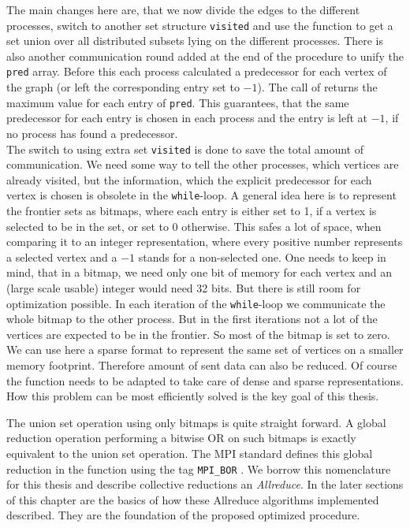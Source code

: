 The main changes here are, that we now divide the edges to the different processes, switch to another set structure \texttt{visited} and use the function  to get a set union over all distributed subsets lying on the different processes. There is also another communication round added at the end of the procedure to unify the \texttt{pred} array.
Before this each process calculated a predecessor for each vertex of the graph (or left the corresponding entry set to $-1$). The call of  returns the maximum value for each entry of \texttt{pred}. This guarantees, that the same predecessor for each entry is chosen in each process and the entry is left at $-1$, if no process has found a predecessor. \\
The switch to using extra set \texttt{visited} is done to save the total amount of communication. We need some way to tell the other processes, which vertices are already visited, but the information, which the explicit predecessor for each vertex is chosen is obsolete in the \texttt{while}-loop.
A general idea here is to represent the frontier sets as bitmaps, where each entry is either set to 1, if a vertex is selected to be in the set, or set to 0 otherwise.
This safes a lot of space, when comparing it to an integer representation, where every positive number represents a selected vertex and a $-1$ stands for a non-selected one.
One needs to keep in mind, that in a bitmap, we need only one bit of memory for each vertex and an (large scale usable) integer would need 32 bits.
But there is still room for optimization possible. In each iteration of the \texttt{while}-loop we communicate the whole bitmap to the other process. But in the first iterations not a lot of the vertices are expected to be in the frontier. So most of the bitmap is set to zero.
We can use here a sparse format to represent the same set of vertices on a smaller memory footprint. Therefore amount of sent data can also be reduced.
Of course the function  needs to be adapted to take care of dense and sparse representations. How this problem can be most efficiently solved is the key goal of this thesis.

The union set operation using only bitmaps is quite straight forward. A global reduction operation performing a bitwise OR on such bitmaps is exactly equivalent to the union set operation. The MPI standard defines this global reduction in the function  using the tag \texttt{MPI\_BOR} \cite{mpi}. We borrow this nomenclature for this thesis and describe collective reductions an \textit{Allreduce}. In the later sections of this chapter are the basics of how these Allreduce algorithms implemented described. They are the foundation of the proposed optimized  procedure.

